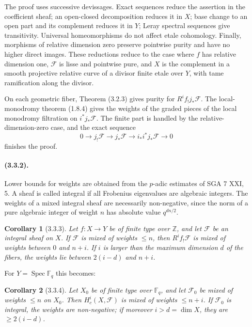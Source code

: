 \documentclass[11pt]{article}
\newtheorem{corollary}{Corollary}
\theoremstyle{remark}
\newcommand{\Fq}{\mathbb{F}_q}
\begin{document}
The proof uses successive devissages. Exact sequences reduce the assertion in the coefficient sheaf; an open-closed decomposition reduces it in $X$; base change to an open part and its complement reduces it in $Y$; Leray spectral sequences give transitivity. Universal homeomorphisms do not affect etale cohomology. Finally, morphisms of relative dimension zero preserve pointwise purity and have no higher direct images. These reductions reduce to the case where $f$ has relative dimension one, $\mathcal F$ is lisse and pointwise pure, and $X$ is the complement in a smooth projective relative curve of a divisor finite etale over $Y$, with tame ramification along the divisor.

On each geometric fiber, Theorem (3.2.3) gives purity for $R^if_{!}j_{*}\mathcal F$. The local-monodromy theorem (1.8.4) gives the weights of the graded pieces of the local monodromy filtration on $i^*j_{*}\mathcal F$. The finite part is handled by the relative-dimension-zero case, and the exact sequence
\[
0\to j_{!}\mathcal F\to j_{*}\mathcal F\to i_{*}i^*j_{*}\mathcal F\to0
\]
finishes the proof.

\paragraph{(3.3.2).}
Lower bounds for weights are obtained from the $p$-adic estimates of SGA 7 XXI, 5. A sheaf is called integral if all Frobenius eigenvalues are algebraic integers. The weights of a mixed integral sheaf are necessarily non-negative, since the norm of a pure algebraic integer of weight $n$ has absolute value $q^{dn/2}$.

\begin{corollary}[3.3.3]
Let $f:X\to Y$ be of finite type over $\mathbb Z$, and let $\mathcal F$ be an integral sheaf on $X$. If $\mathcal F$ is mixed of weights $\le n$, then $R^if_{!}\mathcal F$ is mixed of weights between $0$ and $n+i$. If $i$ is larger than the maximum dimension $d$ of the fibers, the weights lie between $2(i-d)$ and $n+i$.
\end{corollary}

For $Y=\operatorname{Spec}\Fq$ this becomes:

\begin{corollary}[3.3.4]
Let $X_0$ be of finite type over $\Fq$, and let $\mathcal F_0$ be mixed of weights $\le n$ on $X_0$. Then $H^i_c(X,\mathcal F)$ is mixed of weights $\le n+i$. If $\mathcal F_0$ is integral, the weights are non-negative; if moreover $i>d=\dim X$, they are $\ge2(i-d)$.
\end{corollary}
\end{document}

